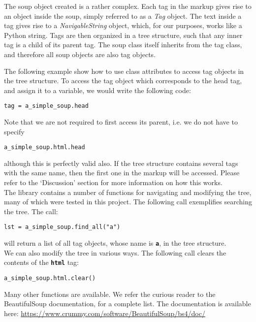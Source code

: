 \documentclass[10pt]{article}
\begin{document}
The soup object created is a rather complex. Each tag in the markup gives rise to an object inside the soup, simply referred to as a \textit{Tag} object. The text inside a tag gives rise to a \textit{NavigableString} object, which, for our purposes, works like a Python string. Tags are then organized in a tree structure, such that any inner tag is a child of its parent tag. The soup class itself inherits from the tag class, and therefore all soup objects are also tag objects. 

The following example show how to use class attributes to access tag objects in the tree structure. To access the tag object which corresponds to the head tag, and assign it to a variable, we would write the following code:

\begin{lstlisting}[style = pythonstyle]
tag = a_simple_soup.head
\end{lstlisting}

Note that we are not required to first access its parent, i.e. we do not have to specify
\begin{lstlisting}[style = pythonstyle]
a_simple_soup.html.head
\end{lstlisting}
although this is perfectly valid also. If the tree structure contains several tags with the same name, then the first one in the markup will be accessed. Please refer to the `Discussion' section for more information on how this works. \\

The library contains a number of functions for navigating and modifying the tree, many of which were tested in this project. The following call exemplifies searching the tree. The call: 

\begin{lstlisting}[style = pythonstyle]
lst = a_simple_soup.find_all("a")
\end{lstlisting}
will return a list of all tag objects, whose name is \texttt{\textbf{a}}, in the tree structure. \\

We can also modify the tree in various ways. The following call clears the contents of the \texttt{\textbf{html}} tag:

\begin{lstlisting}[style = pythonstyle]
a_simple_soup.html.clear()
\end{lstlisting}

Many other functions are available. We refer the curious reader to the BeautifulSoup documentation, for a complete list. The documentation is available here: \url{https://www.crummy.com/software/BeautifulSoup/bs4/doc/}
\end{document}
